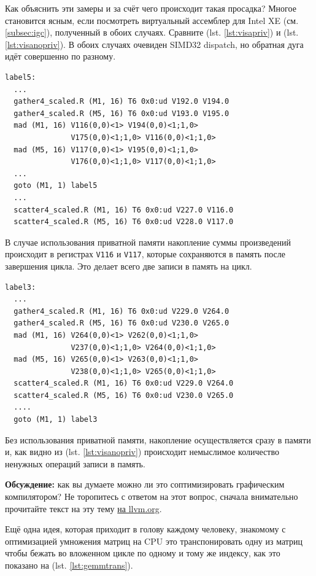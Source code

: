 \documentclass[a4paper,12pt,oneside]{article}
\begin{document}
Как объяснить эти замеры и за счёт чего происходит такая просадка? 
Многое становится ясным, если посмотреть виртуальный ассемблер для Intel XE (см. \ref{subsec:igc}), полученный в обоих случаях. Сравните (lst. \ref{lst:visapriv}) и (lst. \ref{lst:visanopriv}).
В обоих случаях очевиден SIMD32 dispatch, но обратная дуга идёт совершенно по разному.

\begin{lstlisting}[language={[x86masm]Assembler},caption={VISA ассемблер: счётчик в приватной памяти},label={lst:visapriv}]
label5:
  ...
  gather4_scaled.R (M1, 16) T6 0x0:ud V192.0 V194.0
  gather4_scaled.R (M5, 16) T6 0x0:ud V193.0 V195.0
  mad (M1, 16) V116(0,0)<1> V194(0,0)<1;1,0>
               V175(0,0)<1;1,0> V116(0,0)<1;1,0>
  mad (M5, 16) V117(0,0)<1> V195(0,0)<1;1,0>
               V176(0,0)<1;1,0> V117(0,0)<1;1,0>
  ...
  goto (M1, 1) label5
  ...
  scatter4_scaled.R (M1, 16) T6 0x0:ud V227.0 V116.0
  scatter4_scaled.R (M5, 16) T6 0x0:ud V228.0 V117.0
\end{lstlisting}

В случае использования приватной памяти накопление суммы произведений происходит в регистрах \lstinline!V116! и \lstinline!V117!, которые сохраняются в память после завершения цикла. Это делает всего две записи в память на цикл.

\begin{lstlisting}[language={[x86masm]Assembler},caption={VISA ассемблер: приватная память не использована},label={lst:visanopriv}]
label3:
  ...
  gather4_scaled.R (M1, 16) T6 0x0:ud V229.0 V264.0
  gather4_scaled.R (M5, 16) T6 0x0:ud V230.0 V265.0
  mad (M1, 16) V264(0,0)<1> V262(0,0)<1;1,0>
               V237(0,0)<1;1,0> V264(0,0)<1;1,0>
  mad (M5, 16) V265(0,0)<1> V263(0,0)<1;1,0>
               V238(0,0)<1;1,0> V265(0,0)<1;1,0>
  scatter4_scaled.R (M1, 16) T6 0x0:ud V229.0 V264.0
  scatter4_scaled.R (M5, 16) T6 0x0:ud V230.0 V265.0
  ....
  goto (M1, 1) label3
\end{lstlisting}

Без использования приватной памяти, накопление осуществляется сразу в памяти и, как видно из (lst. \ref{lst:visanopriv}) происходит немыслимое количество ненужных операций записи в память.

\textbf{Обсуждение:} как вы думаете можно ли это соптимизировать графическим компилятором? Не торопитесь с ответом на этот вопрос, сначала внимательно прочитайте текст на эту тему \href{https://llvm.org/docs/Atomics.html#id5}{на llvm.org}.

Ещё одна идея, которая приходит в голову каждому человеку, знакомому с оптимизацией умножения матриц на CPU это транспонировать одну из матриц чтобы бежать во вложенном цикле по одному и тому же индексу, как это показано на (lst. \ref{lst:gemmtrans}).
\end{document}
